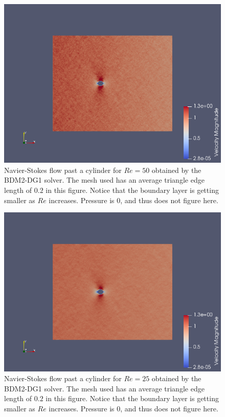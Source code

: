 \documentclass[11pt,twoside,a4paper]{article}
\begin{document}
\begin{figure}
  \includegraphics[width=\linewidth]{nscR50.png}
  \caption{Navier-Stokes flow past a cylinder for $Re = 50$ obtained by the BDM2-DG1 solver. The mesh used has an average triangle edge length of $0.2$ in this figure. Notice that the boundary layer is getting smaller as $Re$ increases. Pressure is $0$, and thus does not figure here.}
\end{figure}

\begin{figure}
  \includegraphics[width=\linewidth]{nscR25.png}
  \caption{Navier-Stokes flow past a cylinder for $Re = 25$ obtained by the BDM2-DG1 solver. The mesh used has an average triangle edge length of $0.2$ in this figure. Notice that the boundary layer is getting smaller as $Re$ increases. Pressure is $0$, and thus does not figure here.}
\end{figure}
\end{document}
